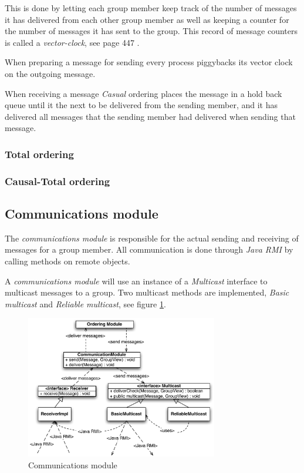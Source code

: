 \documentclass[titlepage, twocolumn, a4paper, 10pt]{article}
\begin{document}
This is done by letting each group member keep track of the number of
messages it has delivered from each other group member as well as
keeping a counter for the number of messages it has sent to the group.
This record of message counters is called a \textit{vector-clock}, see
page 447 \cite{book:dist-syst}.

When preparing a message for sending every process piggybacks its
vector clock on the outgoing message.

When receiving a message \textit{Casual} ordering places the message
in a hold back queue until it the next to be delivered from the
sending member, and it has delivered all messages that the sending
member had delivered when sending that message.

\subsubsection{Total ordering}\label{sec:total}

\subsubsection{Causal-Total ordering}\label{sec:causal-total}

\subsection{Communications module}\label{sec:communications-module}
The \textit{communications module} is responsible for the actual
sending and receiving of messages for a group member. All
communication is done through \textit{Java RMI} by calling methods on
remote objects.

A \textit{communications module} will use an instance of a
\textit{Multicast} interface to multicast messages to a group. Two
multicast methods are implemented, \textit{Basic multicast} and
\textit{Reliable multicast}, see figure \ref{fig:images/commodule}.

\begin{figure}[!thb]
  \centering
  \includegraphics[width=3.3in]{images/ComModule.pdf}
  \caption{Communications module}
  \label{fig:images/commodule}
\end{figure}
\end{document}
